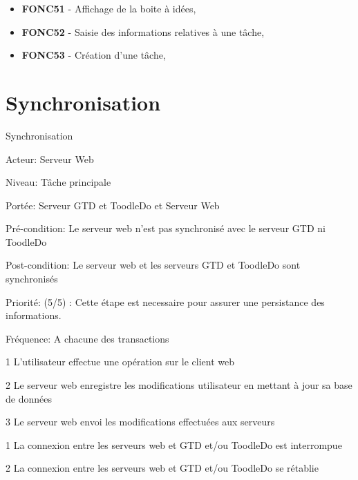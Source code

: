 
\begin{itemize}	\renewcommand{\labelitemi}{}
	\item \textbf{FONC51} - Affichage de la boite à idées,
	\item \textbf{FONC52} - Saisie des informations relatives à une tâche,
	\item \textbf{FONC53} - Création d'une tâche,
\end{itemize}







\section{Synchronisation}
\begin{usecase}{Synchronisation}

\begin{information}
\item[Acteur: ] Serveur Web
\item[Niveau:] Tâche principale
\item[Portée:] Serveur GTD et ToodleDo et Serveur Web
\item[Pré-condition:] Le serveur web n'est pas synchronisé avec le serveur GTD ni ToodleDo
\item[Post-condition:] Le serveur web et les serveurs GTD et ToodleDo sont synchronisés
\item[Priorité:] (5/5) : Cette étape est necessaire pour assurer une persistance des informations.
\item[Fréquence:] A chacune des transactions
\end{information}	

\begin{scenario}
\item[1] L'utilisateur effectue une opération sur le client web
\item[2] Le serveur web enregistre les modifications utilisateur en mettant à jour sa base de données
\item[3] Le serveur web envoi les modifications effectuées aux serveurs
\end{scenario}	

\begin{extension}
	\item[1]La connexion entre les serveurs web et GTD et/ou ToodleDo est interrompue
	\item[2]La connexion entre les serveurs web et GTD et/ou ToodleDo se rétablie
\end{extension}
\end{usecase}

